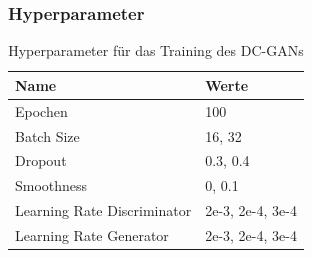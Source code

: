 \subsubsection{Hyperparameter}
\begin{table}[H]
	\centering
	\begin{tabular}{l l}
		Name                        & Werte            \\ \hline
		Epochen                     & 100              \\
		Batch Size                  & 16, 32           \\
		Dropout                     & 0.3, 0.4         \\
		Smoothness                  & 0, 0.1           \\
		Learning Rate Discriminator & 2e-3, 2e-4, 3e-4 \\
		Learning Rate Generator     & 2e-3, 2e-4, 3e-4
	\end{tabular}
	\caption{Hyperparameter für das Training des DC-GANs}
\end{table}
